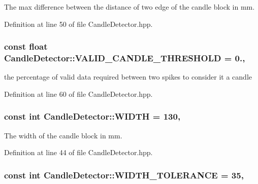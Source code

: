 The max difference between the distance of two edge of the candle block in mm. 



Definition at line 50 of file Candle\-Detector.\-hpp.

\hypertarget{classCandleDetector_ac8aa00d0477ff096c344ec71d8ccdf82}{
\subsubsection[{V\-A\-L\-I\-D\-\_\-\-C\-A\-N\-D\-L\-E\-\_\-\-T\-H\-R\-E\-S\-H\-O\-L\-D}]{\setlength{\rightskip}{0pt plus 5cm}const float Candle\-Detector\-::\-V\-A\-L\-I\-D\-\_\-\-C\-A\-N\-D\-L\-E\-\_\-\-T\-H\-R\-E\-S\-H\-O\-L\-D = 0.\hspace{0.3cm}{\ttfamily [static]}, {\ttfamily [private]}}}\label{classCandleDetector_ac8aa00d0477ff096c344ec71d8ccdf82}


the percentage of valid data required between two spikes to consider it a candle 



Definition at line 60 of file Candle\-Detector.\-hpp.

\hypertarget{classCandleDetector_af4c5d2170cea56fa4263639f20ed13ed}{
\subsubsection[{W\-I\-D\-T\-H}]{\setlength{\rightskip}{0pt plus 5cm}const int Candle\-Detector\-::\-W\-I\-D\-T\-H = 130\hspace{0.3cm}{\ttfamily [static]}, {\ttfamily [private]}}}\label{classCandleDetector_af4c5d2170cea56fa4263639f20ed13ed}


The width of the candle block in mm. 



Definition at line 44 of file Candle\-Detector.\-hpp.

\hypertarget{classCandleDetector_a1c8f0232491ba37dd10032c1da376145}{
\subsubsection[{W\-I\-D\-T\-H\-\_\-\-T\-O\-L\-E\-R\-A\-N\-C\-E}]{\setlength{\rightskip}{0pt plus 5cm}const int Candle\-Detector\-::\-W\-I\-D\-T\-H\-\_\-\-T\-O\-L\-E\-R\-A\-N\-C\-E = 35\hspace{0.3cm}{\ttfamily [static]}, {\ttfamily [private]}}}\label{classCandleDetector_a1c8f0232491ba37dd10032c1da376145}


